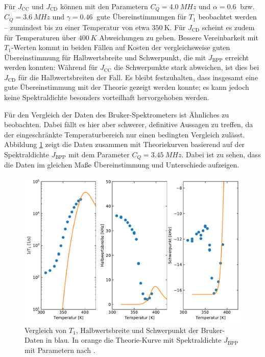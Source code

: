 Für $J_\text{CC}$ und $J_\text{CD}$ können mit den Parametern $C_Q = \SI{4.0}{MHz}$ und $\alpha = \SI{0.6}{}$ bzw. $C_Q = \SI{3.6}{MHz}$ und $\gamma = \SI{0.46}{}$ gute Übereinstimmungen für $T_1$ beobachtet werden -- zumindest bis zu einer Temperatur von etwa $\SI{350}{\kelvin}$. Für $J_\text{CD}$ scheint es zudem für Temperaturen über $\SI{400}{K}$ Abweichungen zu geben. Bessere Vereinbarkeit mit $T_1$-Werten kommt in beiden Fällen auf Kosten der vergleichsweise guten Übereinstimmung für Halbwertsbreite und Schwerpunkt, die mit $J_\text{BPP}$ erreicht werden konnten: Während für $J_\text{CC}$ die Schwerpunkte stark abweichen, ist dies bei $J_\text{CD}$ für die Halbwertsbreiten der Fall. Es bleibt festzuhalten, dass insgesamt eine gute Übereinstimmung mit der Theorie gezeigt werden konnte; es kann jedoch keine Spektraldichte besonders vorteilhaft hervorgehoben werden.

Für den Vergleich der Daten des Bruker-Spektrometers ist Ähnliches zu beobachten. Dabei fällt es hier aber schwerer, definitive Aussagen zu treffen, da der eingeschränkte Temperaturbereich nur einen bedingten Vergleich zulässt. Abbildung \ref{fig:res:theorie_bruker} zeigt die Daten zusammen mit Theoriekurven basierend auf der Spektraldichte $J_\text{BPP}$ mit dem Parameter $C_Q = \SI{3.45}{MHz}$. Dabei ist zu sehen, dass die Daten im gleichen Maße Übereinstimmung und Unterschiede aufzeigen.
\begin{figure}
	\begin{center}
		\includegraphics[width=.9\textwidth]{graphics/plot/Bruker_J_01.pdf}
	\end{center}
	\caption{Vergleich von $T_1$, Halbwertsbreite und Schwerpunkt der Bruker-Daten in blau. In orange die Theorie-Kurve mit Spektraldichte $J_\text{BPP}$ mit Parametern nach \cite{PIMENOV199793}.} \label{fig:res:theorie_bruker}
\end{figure}


